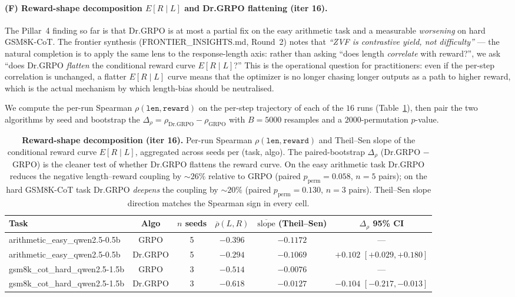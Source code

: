 \paragraph{(F) Reward-shape decomposition $E[R \mid L]$ and Dr.GRPO flattening (iter 16).}
The Pillar~4 finding so far is that Dr.GRPO is at most a partial fix on the
easy arithmetic task and a measurable \emph{worsening} on hard GSM8K-CoT.
The frontier synthesis (FRONTIER\_INSIGHTS.md, Round~2) notes that
\textit{``ZVF is contrastive yield, not difficulty''} --- the natural
completion is to apply the same lens to the response-length axis: rather
than asking ``does length \emph{correlate} with reward?'', we ask
``does Dr.GRPO \emph{flatten} the conditional reward curve $E[R \mid L]$?''
This is the operational question for practitioners: even if the
per-step correlation is unchanged, a flatter $E[R\mid L]$ curve means
that the optimizer is no longer chasing longer outputs as a path to
higher reward, which is the actual mechanism by which length-bias
should be neutralised.

We compute the per-run Spearman $\rho(\texttt{len}, \texttt{reward})$
on the per-step trajectory of each of the $16$ runs (Table~\ref{tab:reward-shape}),
then pair the two algorithms by seed and bootstrap the
$\Delta_{\rho} = \rho_{\mathrm{Dr.GRPO}} - \rho_{\mathrm{GRPO}}$ with
$B{=}5000$ resamples and a $2000$-permutation $p$-value.

\begin{table}[htbp]
\centering\small
\begin{tabular}{l c c c c c}
\hline
\textbf{Task} & \textbf{Algo} & \textbf{$n$ seeds} & \textbf{$\overline{\rho}(L,R)$} & \textbf{$\overline{\text{slope}}$ (Theil--Sen)} & \textbf{$\Delta_{\rho}$ 95\% CI}\\
\hline
arithmetic\_easy\_qwen2.5-0.5b & GRPO    & 5 & $-0.396$ & $-0.1172$ & --- \\
arithmetic\_easy\_qwen2.5-0.5b & Dr.GRPO & 5 & $-0.294$ & $-0.1069$ & $+0.102$ $[+0.029, +0.180]$ \\
gsm8k\_cot\_hard\_qwen2.5-1.5b  & GRPO    & 3 & $-0.514$ & $-0.0076$ & --- \\
gsm8k\_cot\_hard\_qwen2.5-1.5b  & Dr.GRPO & 3 & $-0.618$ & $-0.0127$ & $-0.104$ $[-0.217, -0.013]$ \\
\hline
\end{tabular}
\caption{\textbf{Reward-shape decomposition (iter 16).}
Per-run Spearman $\rho(\texttt{len},\texttt{reward})$ and Theil--Sen slope
of the conditional reward curve $E[R\mid L]$, aggregated across seeds
per (task, algo). The paired-bootstrap $\Delta_{\rho}$
(Dr.GRPO $-$ GRPO) is the cleaner test of whether Dr.GRPO flattens the
reward curve. On the easy arithmetic task Dr.GRPO reduces the negative
length--reward coupling by $\sim 26\%$ relative to GRPO (paired
$p_{\mathrm{perm}}{=}0.058$, $n{=}5$ pairs); on the hard GSM8K-CoT task
Dr.GRPO \emph{deepens} the coupling by $\sim 20\%$ (paired
$p_{\mathrm{perm}}{=}0.130$, $n{=}3$ pairs). Theil--Sen slope direction
matches the Spearman sign in every cell.}
\label{tab:reward-shape}
\end{table}

